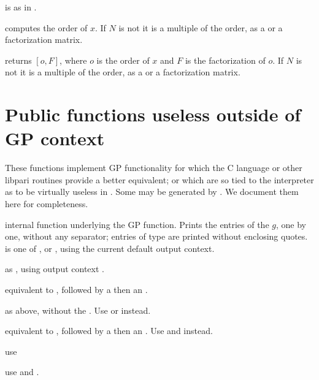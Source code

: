  is as in .

computes the order of $x$. If $N$ is not  it is a multiple of the
order, as a  or a factorization matrix.

returns $[o,F]$, where $o$ is the order of $x$ and $F$ is the factorization
of $o$. If $N$ is not  it is a multiple of the order, as a
 or a factorization matrix.

\section{Public functions useless outside of GP context}

These functions implement GP functionality for which the C language or
other libpari routines provide a better equivalent; or which are so tied
to the  interpreter as to be virtually useless in . Some
may be generated by . We document them here for completeness.


 internal function underlying the
 GP function. Prints the entries of the  $g$, one by one,
without any separator; entries of type  are printed without enclosing
quotes. \fl is one of ,  or , using the
current default output context.

 as ,
using output context .

 equivalent to , followed
by a  then an .

 as above, without the . Use
 or  instead.

 equivalent to , followed
by a  then an . Use  and
 instead.


 use 

 use  and
.

